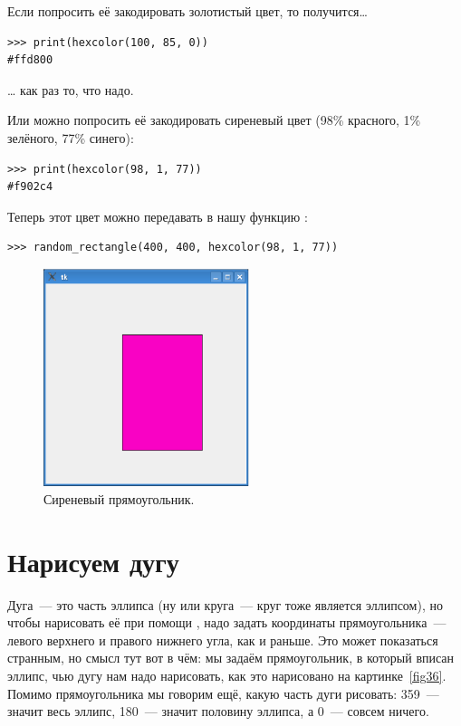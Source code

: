 Если попросить её закодировать золотистый цвет, то получится…

\begin{listing}
\begin{verbatim}
>>> print(hexcolor(100, 85, 0))
#ffd800
\end{verbatim}
\end{listing}

… как раз то, что надо.

Или можно попросить её закодировать сиреневый цвет (98\% красного, 1\% зелёного, 77\% синего):

\begin{listing}
\begin{verbatim}
>>> print(hexcolor(98, 1, 77))
#f902c4
\end{verbatim}
\end{listing}

Теперь этот цвет можно передавать в нашу функцию :

\begin{listing}
\begin{verbatim}
>>> random_rectangle(400, 400, hexcolor(98, 1, 77))
\end{verbatim}
\end{listing}

\begin{figure}
\begin{center}
\includegraphics[width=60mm]{../en/figure35.eps}
\end{center}
\caption{Сиреневый прямоугольник.}\label{fig35}
\end{figure}

\section{Нарисуем дугу}

Дуга — это часть эллипса (ну или круга — круг тоже является эллипсом), но чтобы нарисовать её при помощи , надо задать координаты прямоугольника — левого верхнего и правого нижнего угла, как и раньше. Это может показаться странным, но смысл тут вот в чём: мы задаём прямоугольник, в который вписан эллипс, чью дугу нам надо нарисовать, как это нарисовано на картинке \ref{fig36}. Помимо прямоугольника мы говорим ещё, какую часть дуги рисовать: 359 — значит весь эллипс, 180 — значит половину эллипса, а 0 — совсем ничего.

